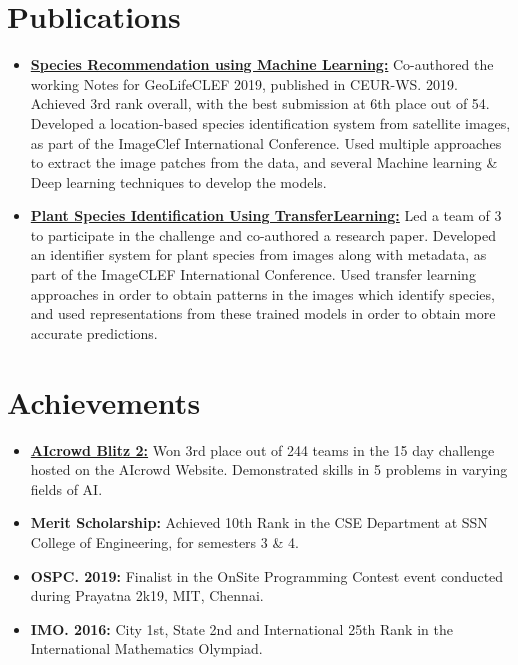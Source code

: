 \documentclass[letterpaper,11pt]{article}
\newcommand{\resumeItem}[2]{
\item\small{
\textbf{#1}{ #2 \vspace{-2pt} }
}
}
\newcommand{\resumeSubHeadingListStart}{\begin{itemize}[leftmargin=*]}
\newcommand{\resumeSubHeadingListEnd}{\end{itemize}}
\begin{document}
\section{Publications}
\resumeSubHeadingListStart
\resumeItem{\href{http://ceur-ws.org/Vol-2380/paper_71.pdf}{\textsc{\icon{\faExternalLink}} Species Recommendation using Machine Learning:}}{Co-authored the working Notes for GeoLifeCLEF 2019, published in CEUR-WS. 2019. Achieved 3rd rank overall, with the best submission at 6th place out of 54. Developed a location-based species identification system from satellite images, as part of the ImageClef International Conference. Used multiple approaches to extract the image patches from the data, and several Machine learning \& Deep learning techniques to develop the models.}
\resumeItem{\href{http://ceur-ws.org/Vol-2696/paper_139.pdf}{\textsc{\icon{\faExternalLink}} Plant Species Identification Using TransferLearning:}}{Led a team of 3 to participate in the challenge and co-authored a research paper. Developed an identifier system for plant species from images along with metadata, as part of the ImageCLEF International Conference. Used transfer learning approaches in order to obtain patterns in the images which identify species, and used representations from these trained models in order to obtain more accurate predictions.}
\resumeSubHeadingListEnd

\section{Achievements}
\resumeSubHeadingListStart
\resumeItem{\href{https://github.com/RamKaushikR/AIcrowd-Blitz-2}{\textsc{\icon{\faExternalLink}} AIcrowd Blitz 2:}}{Won 3rd place out of 244 teams in the 15 day challenge hosted on the AIcrowd Website. Demonstrated skills in 5 problems in varying fields of AI.}
\resumeItem{Merit Scholarship:}{Achieved 10th Rank in the CSE Department at SSN College of Engineering, for semesters 3 \& 4.}
\resumeItem{OSPC. 2019:}{Finalist in the OnSite Programming Contest event conducted during Prayatna 2k19, MIT, Chennai.}
\resumeItem{IMO. 2016:}{City 1st, State 2nd and International 25th Rank in the International Mathematics Olympiad.}
\resumeSubHeadingListEnd
\end{document}
